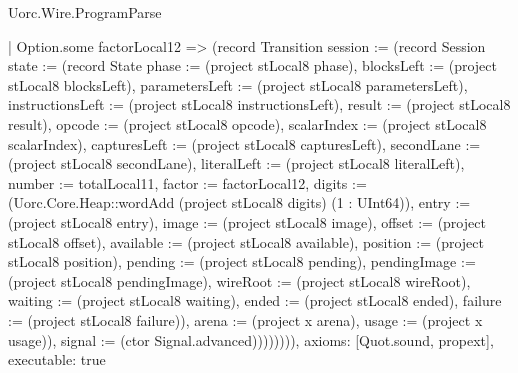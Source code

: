 \begin{lexlean}{Uorc.Wire.ProgramParse}
\begin{semanticmodule}
{        | Option.some factorLocal12 => (record Transition {session := (record Session {state := (record State {phase := (project stLocal8 phase), blocksLeft := (project stLocal8 blocksLeft), parametersLeft := (project stLocal8 parametersLeft), instructionsLeft := (project stLocal8 instructionsLeft), result := (project stLocal8 result), opcode := (project stLocal8 opcode), scalarIndex := (project stLocal8 scalarIndex), capturesLeft := (project stLocal8 capturesLeft), secondLane := (project stLocal8 secondLane), literalLeft := (project stLocal8 literalLeft), number := totalLocal11, factor := factorLocal12, digits := (Uorc.Core.Heap::wordAdd (project stLocal8 digits) (1 : UInt64)), entry := (project stLocal8 entry), image := (project stLocal8 image), offset := (project stLocal8 offset), available := (project stLocal8 available), position := (project stLocal8 position), pending := (project stLocal8 pending), pendingImage := (project stLocal8 pendingImage), wireRoot := (project stLocal8 wireRoot), waiting := (project stLocal8 waiting), ended := (project stLocal8 ended), failure := (project stLocal8 failure)}), arena := (project x arena), usage := (project x usage)}), signal := (ctor Signal.advanced)}))))))),
  axioms: [Quot.sound, propext],
  executable: true
}


\end{semanticmodule}
\end{lexlean}
